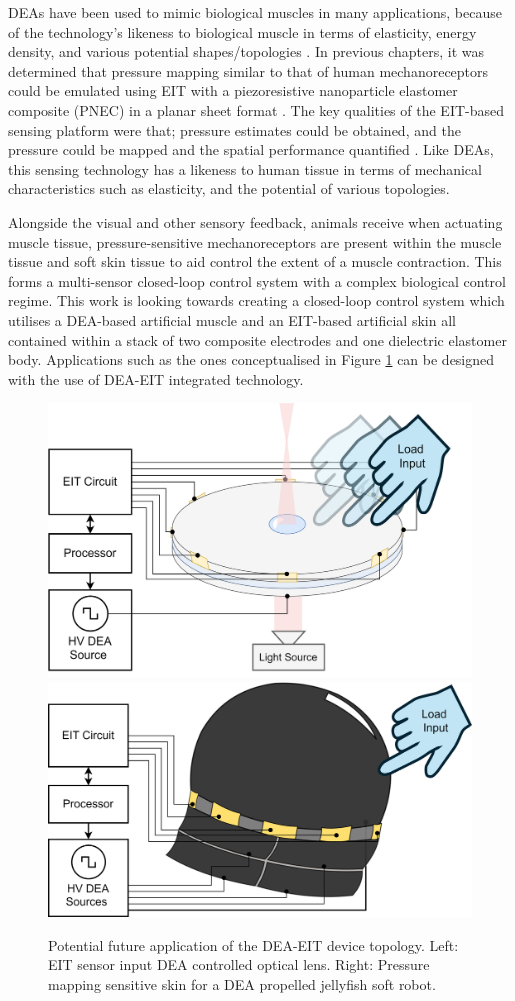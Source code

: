 DEAs have been used to mimic biological muscles in many applications, because of the technology's likeness to biological muscle in terms of elasticity, energy density, and various potential shapes/topologies \cite{Rosset2016, Hajiesmaili2021, Guo2021} . In previous chapters, it was determined that pressure mapping similar to that of human mechanoreceptors could be emulated using EIT with a piezoresistive nanoparticle elastomer composite (PNEC) in a planar sheet format \cite{Ellingham2022} . The key qualities of the EIT-based sensing platform were that; pressure estimates could be obtained, and the pressure could be mapped and the spatial performance quantified \cite{Ellingham2024} . Like DEAs, this sensing technology has a likeness to human tissue in terms of mechanical characteristics such as elasticity, and the potential of various topologies.

Alongside the visual and other sensory feedback, animals receive when actuating muscle tissue, pressure-sensitive mechanoreceptors are present within the muscle tissue \cite{Iheanacho2023} and soft skin tissue to aid control the extent of a muscle contraction. This forms a multi-sensor closed-loop control system with a complex biological control regime. This work is looking towards creating a closed-loop control system which utilises a DEA-based artificial muscle and an EIT-based artificial skin all contained within a stack of two composite electrodes and one dielectric elastomer body. Applications such as the ones conceptualised in Figure \ref{fig:dea-eit-applications} can be designed with the use of DEA-EIT integrated technology.

\begin{figure}[H]
	\centering
	\includegraphics[width=0.41\linewidth]{Figures/DEA-EIT_lens_application_lit.png}
	\hspace{1cm}
	\includegraphics[width=0.44\linewidth]{Figures/DEA-EIT_jellyfish_application.png}
	\vspace{0.3cm}
	\caption{Potential future application of the DEA-EIT device topology. Left: EIT sensor input DEA controlled optical lens. Right: Pressure mapping sensitive skin for a DEA propelled jellyfish soft robot.}
	\label{fig:dea-eit-applications}
\end{figure}


